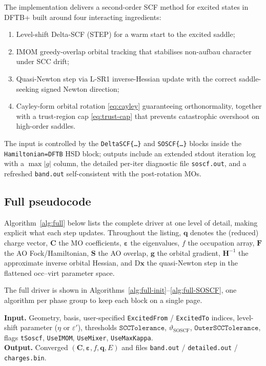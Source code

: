 \documentclass[11pt,a4paper]{article}
\newcommand{\xx}{\mathbf{x}}
\newcommand{\gg}{\mathbf{g}}
\newcommand{\HH}{\mathbf{H}}
\newcommand{\FF}{\mathbf{F}}
\newcommand{\CC}{\mathbf{C}}
\newcommand{\SS}{\mathbf{S}}
\newcommand{\qq}{\mathbf{q}}
\begin{document}
The implementation delivers a second-order SCF method for excited
states in DFTB+ built around four interacting ingredients:
\begin{enumerate}[leftmargin=*]
\item Level-shift Delta-SCF (STEP) for a warm start to the excited
saddle;
\item IMOM greedy-overlap orbital tracking that stabilises non-aufbau
character under SCC drift;
\item Quasi-Newton step via L-SR1 inverse-Hessian update with the
correct saddle-seeking signed Newton direction;
\item Cayley-form orbital rotation \eqref{eq:cayley} guaranteeing
orthonormality, together with a trust-region cap
\eqref{eq:trust-cap} that prevents catastrophic overshoot on high-order
saddles.
\end{enumerate}
The input is controlled by the \texttt{DeltaSCF\{\dots\}} and
\texttt{SOSCF\{\dots\}} blocks inside the \texttt{Hamiltonian=DFTB} HSD
block; outputs include an extended stdout iteration log with a
$\max|g|$ column, the detailed per-iter diagnostic file \texttt{soscf.out},
and a refreshed \texttt{band.out} self-consistent with the post-rotation
MOs.

\subsection*{Full pseudocode}

Algorithm~\ref{alg:full} below lists the complete driver at one level
of detail, making explicit what each step updates. Throughout the
listing, $\qq$ denotes the (reduced) charge vector,
$\CC$ the MO coefficients, $\bm{\varepsilon}$ the eigenvalues,
$f$ the occupation array, $\FF$ the AO Fock/Hamiltonian,
$\SS$ the AO overlap, $\gg$ the orbital gradient,
$\HH^{-1}$ the approximate inverse orbital Hessian, and
$\mathrm{D}\xx$ the quasi-Newton step in the flattened occ--virt
parameter space.

The full driver is shown in Algorithms~\ref{alg:full-init}--\ref{alg:full-SOSCF},
one algorithm per phase group to keep each block on a single page.

\medskip

\textbf{Input.} Geometry, basis, user-specified
\texttt{ExcitedFrom} / \texttt{ExcitedTo} indices, level-shift parameter
($\eta$ or $\varepsilon'$), thresholds $\mathtt{SCCTolerance}$,
$\vartheta_\mathrm{SOSCF}$, $\mathtt{OuterSCCTolerance}$, flags
\texttt{tSoscf}, \texttt{UseIMOM}, \texttt{UseMixer}, \texttt{UseMaxKappa}.\\
\textbf{Output.} Converged $(\CC, \bm{\varepsilon}, f, \qq, E)$
and files \texttt{band.out} / \texttt{detailed.out} / \texttt{charges.bin}.
\end{document}
